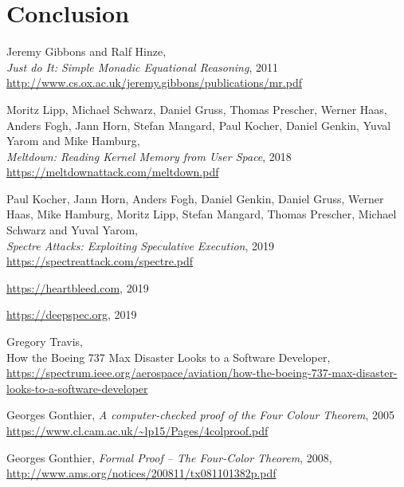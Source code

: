 \documentclass[declaration,inz,english,shortabstract]{iithesis}
\begin{document}
\chapter{Conclusion}


\begin{thebibliography}{1}

        Jeremy Gibbons and Ralf Hinze, \\
        \textit{Just do It: Simple Monadic Equational Reasoning}, 2011 \\
        \url{http://www.cs.ox.ac.uk/jeremy.gibbons/publications/mr.pdf}

        Moritz Lipp, Michael Schwarz, Daniel Gruss, Thomas Prescher, Werner Haas, Anders Fogh, Jann Horn, Stefan Mangard, Paul Kocher, Daniel Genkin, Yuval Yarom and Mike Hamburg, \\
        \textit{Meltdown: Reading Kernel Memory from User Space}, 2018 \\
        \url{https://meltdownattack.com/meltdown.pdf}

        Paul Kocher, Jann Horn, Anders Fogh, Daniel Genkin, Daniel Gruss, Werner Haas, Mike Hamburg, Moritz Lipp, Stefan Mangard, Thomas Prescher, Michael Schwarz and Yuval Yarom, \\
        \textit{Spectre Attacks: Exploiting Speculative Execution}, 2019 \\
        \url{https://spectreattack.com/spectre.pdf}
    
        \url{https://heartbleed.com},
        2019

        \url{https://deepspec.org},
        2019

        Gregory Travis, \\
        How the Boeing 737 Max Disaster Looks to a Software Developer, \\
        \url{https://spectrum.ieee.org/aerospace/aviation/how-the-boeing-737-max-disaster-looks-to-a-software-developer}
    
        Georges Gonthier,
        \textit{A computer-checked proof of the Four Colour Theorem}, 2005 \\
        \url{https://www.cl.cam.ac.uk/~lp15/Pages/4colproof.pdf}
    
        Georges Gonthier,
        \textit{Formal Proof -- The Four-Color Theorem}, 2008, \\
        \url{http://www.ams.org/notices/200811/tx081101382p.pdf}


\end{thebibliography}
\end{document}
